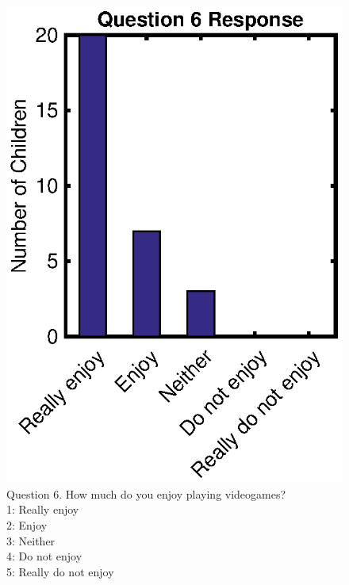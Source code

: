 	\begin{figure}
		\centering
		\includegraphics{figures/gamepaper/Question6}
		\caption[Feedback Videogame Survey Question 6]{Question 6. How much do you enjoy playing videogames? \\ 1: Really enjoy\\ 2: Enjoy\\ 3: Neither\\ 4: Do not enjoy \\ 5: Really do not enjoy}
		\label{fig:question6}
	\end{figure}
	
